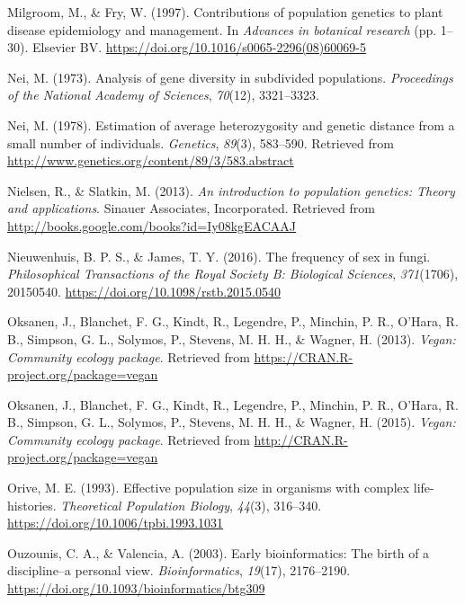 \documentclass[double,11pt]{beavtex}
\begin{document}
  \hypertarget{ref-milgroom1997contributions}{}
  Milgroom, M., \& Fry, W. (1997). Contributions of population genetics to
  plant disease epidemiology and management. In \emph{Advances in
  botanical research} (pp. 1--30). Elsevier BV.
  \url{https://doi.org/10.1016/s0065-2296(08)60069-5}
  
  \hypertarget{ref-nei1973analysis}{}
  Nei, M. (1973). Analysis of gene diversity in subdivided populations.
  \emph{Proceedings of the National Academy of Sciences}, \emph{70}(12),
  3321--3323.
  
  \hypertarget{ref-Nei:1978}{}
  Nei, M. (1978). Estimation of average heterozygosity and genetic
  distance from a small number of individuals. \emph{Genetics},
  \emph{89}(3), 583--590. Retrieved from
  \url{http://www.genetics.org/content/89/3/583.abstract}
  
  \hypertarget{ref-nielsen2013introduction}{}
  Nielsen, R., \& Slatkin, M. (2013). \emph{An introduction to population
  genetics: Theory and applications}. Sinauer Associates, Incorporated.
  Retrieved from \url{http://books.google.com/books?id=Iy08kgEACAAJ}
  
  \hypertarget{ref-nieuwenhuis2016frequency}{}
  Nieuwenhuis, B. P. S., \& James, T. Y. (2016). The frequency of sex in
  fungi. \emph{Philosophical Transactions of the Royal Society B:
  Biological Sciences}, \emph{371}(1706), 20150540.
  \url{https://doi.org/10.1098/rstb.2015.0540}
  
  \hypertarget{ref-oksanen2013vegan}{}
  Oksanen, J., Blanchet, F. G., Kindt, R., Legendre, P., Minchin, P. R.,
  O'Hara, R. B., Simpson, G. L., Solymos, P., Stevens, M. H. H., \&
  Wagner, H. (2013). \emph{Vegan: Community ecology package}. Retrieved
  from \url{https://CRAN.R-project.org/package=vegan}
  
  \hypertarget{ref-oksanen2015vegan}{}
  Oksanen, J., Blanchet, F. G., Kindt, R., Legendre, P., Minchin, P. R.,
  O'Hara, R. B., Simpson, G. L., Solymos, P., Stevens, M. H. H., \&
  Wagner, H. (2015). \emph{Vegan: Community ecology package}. Retrieved
  from \url{http://CRAN.R-project.org/package=vegan}
  
  \hypertarget{ref-orive1993effective}{}
  Orive, M. E. (1993). Effective population size in organisms with complex
  life-histories. \emph{Theoretical Population Biology}, \emph{44}(3),
  316--340. \url{https://doi.org/10.1006/tpbi.1993.1031}
  
  \hypertarget{ref-ouzounis2003bioinformatics}{}
  Ouzounis, C. A., \& Valencia, A. (2003). Early bioinformatics: The birth
  of a discipline--a personal view. \emph{Bioinformatics}, \emph{19}(17),
  2176--2190. \url{https://doi.org/10.1093/bioinformatics/btg309}
  
\end{document}
